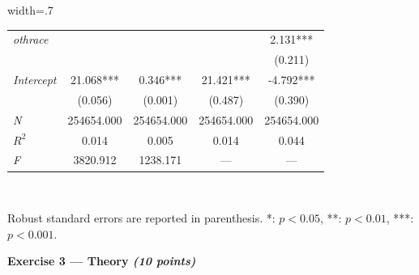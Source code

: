 \documentclass{article}
\begin{document}
\begin{table}[hp!]
\begin{adjustbox}{width=.7\textwidth}
\begin{tabular}{l|cccc|}
\multicolumn{1}{|l|}{\textit{othrace}}  &                      &                      &                      & 2.131***              \\
\multicolumn{1}{|l|}{\textit{}}         &                      &                      &                      & (0.211)               \\
\multicolumn{1}{|l|}{\textit{Intercept}}   & 21.068***            & 0.346***             & 21.421***            & -4.792***             \\
\multicolumn{1}{|l|}{\textit{}}         & (0.056)              & (0.001)              & (0.487)              & (0.390)               \\ \hline
\multicolumn{1}{|l|}{\textit{N}}        & 254654.000           & 254654.000           & 254654.000           & 254654.000            \\
\multicolumn{1}{|l|}{\textit{$R^2$}}       & 0.014                & 0.005                & 0.014                & 0.044                 \\
\multicolumn{1}{|l|}{\textit{F}}        & 3820.912             & 1238.171             & ---                  & ---                   \\ \hline
\end{tabular}
\end{adjustbox}
\\[1em]
\begin{minipage}{\textwidth} %
\footnotesize{Robust standard errors are reported in parenthesis. *: $p<0.05$, **: $p<0.01$, ***: $p<0.001$. \par}
\end{minipage}
\end{table}

\vspace{1cm}
\textbf{Exercise 3 --- Theory \textit{(10 points)}} \\[1em]
\end{document}
